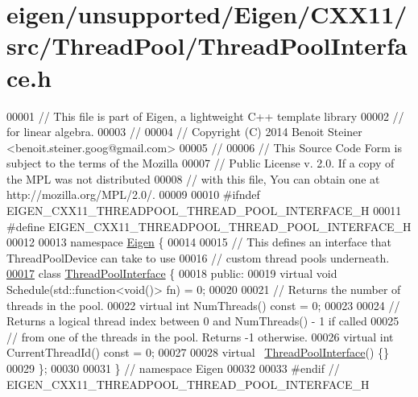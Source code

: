 \hypertarget{eigen_2unsupported_2_eigen_2_c_x_x11_2src_2_thread_pool_2_thread_pool_interface_8h_source}{}\section{eigen/unsupported/\+Eigen/\+C\+X\+X11/src/\+Thread\+Pool/\+Thread\+Pool\+Interface.h}
\label{eigen_2unsupported_2_eigen_2_c_x_x11_2src_2_thread_pool_2_thread_pool_interface_8h_source}

\begin{DoxyCode}
00001 \textcolor{comment}{// This file is part of Eigen, a lightweight C++ template library}
00002 \textcolor{comment}{// for linear algebra.}
00003 \textcolor{comment}{//}
00004 \textcolor{comment}{// Copyright (C) 2014 Benoit Steiner <benoit.steiner.goog@gmail.com>}
00005 \textcolor{comment}{//}
00006 \textcolor{comment}{// This Source Code Form is subject to the terms of the Mozilla}
00007 \textcolor{comment}{// Public License v. 2.0. If a copy of the MPL was not distributed}
00008 \textcolor{comment}{// with this file, You can obtain one at http://mozilla.org/MPL/2.0/.}
00009 
00010 \textcolor{preprocessor}{#ifndef EIGEN\_CXX11\_THREADPOOL\_THREAD\_POOL\_INTERFACE\_H}
00011 \textcolor{preprocessor}{#define EIGEN\_CXX11\_THREADPOOL\_THREAD\_POOL\_INTERFACE\_H}
00012 
00013 \textcolor{keyword}{namespace }\hyperlink{namespace_eigen}{Eigen} \{
00014 
00015 \textcolor{comment}{// This defines an interface that ThreadPoolDevice can take to use}
00016 \textcolor{comment}{// custom thread pools underneath.}
\hyperlink{class_eigen_1_1_thread_pool_interface}{00017} \textcolor{keyword}{class }\hyperlink{class_eigen_1_1_thread_pool_interface}{ThreadPoolInterface} \{
00018  \textcolor{keyword}{public}:
00019   \textcolor{keyword}{virtual} \textcolor{keywordtype}{void} Schedule(std::function<\textcolor{keywordtype}{void}()> fn) = 0;
00020 
00021   \textcolor{comment}{// Returns the number of threads in the pool.}
00022   \textcolor{keyword}{virtual} \textcolor{keywordtype}{int} NumThreads() \textcolor{keyword}{const} = 0;
00023 
00024   \textcolor{comment}{// Returns a logical thread index between 0 and NumThreads() - 1 if called}
00025   \textcolor{comment}{// from one of the threads in the pool. Returns -1 otherwise.}
00026   \textcolor{keyword}{virtual} \textcolor{keywordtype}{int} CurrentThreadId() \textcolor{keyword}{const} = 0;
00027 
00028   \textcolor{keyword}{virtual} ~\hyperlink{class_eigen_1_1_thread_pool_interface}{ThreadPoolInterface}() \{\}
00029 \};
00030 
00031 \}  \textcolor{comment}{// namespace Eigen}
00032 
00033 \textcolor{preprocessor}{#endif  // EIGEN\_CXX11\_THREADPOOL\_THREAD\_POOL\_INTERFACE\_H}
\end{DoxyCode}
